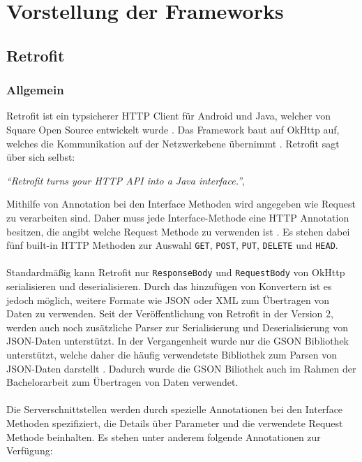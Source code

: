 \chapter{Vorstellung der Frameworks}
\label{chapter:frameworks}

\section{Retrofit}

\subsection{Allgemein}
Retrofit ist ein typsicherer HTTP Client für Android und Java, welcher von Square Open Source entwickelt wurde \cite{retrofit}. Das Framework baut auf OkHttp auf, welches die Kommunikation auf der Netzwerkebene übernimmt \cite{okhttp}. Retrofit sagt über sich selbst:

\begin{center}
	\textit{\textquotedblleft Retrofit turns your HTTP API into a Java interface.\textquotedblright}, \cite[Webseite von Retrofit]{retrofit} 
	\\
\end{center}

Mithilfe von Annotation bei den Interface Methoden wird angegeben wie Request zu verarbeiten sind. Daher muss jede Interface-Methode eine HTTP Annotation besitzen, die angibt welche Request Methode zu verwenden ist \cite{retrofit}. Es stehen dabei fünf built-in HTTP Methoden zur Auswahl \texttt{GET}, \texttt{POST}, \texttt{PUT}, \texttt{DELETE} und \texttt{HEAD}.
\\\\
Standardmäßig kann Retrofit nur \texttt{ResponseBody} und \texttt{RequestBody} von OkHttp serialisieren und deserialisieren. Durch das hinzufügen von Konvertern ist es jedoch möglich, weitere Formate wie JSON oder XML zum Übertragen von Daten zu verwenden. Seit der Veröffentlichung von Retrofit in der Version 2, werden auch noch zusätzliche Parser zur Serialisierung und Deserialisierung von JSON-Daten unterstützt. In der Vergangenheit wurde nur die GSON Bibliothek unterstützt, welche daher die häufig verwendetste Bibliothek zum Parsen von JSON-Daten darstellt \cite{consumingRetrofit}. Dadurch wurde die GSON Biliothek auch im Rahmen der Bachelorarbeit zum Übertragen von Daten verwendet.
\\\\
Die Serverschnittstellen werden durch spezielle Annotationen bei den Interface Methoden spezifiziert, die Details über Parameter und die verwendete Request Methode beinhalten. Es stehen unter anderem folgende Annotationen zur Verfügung:

